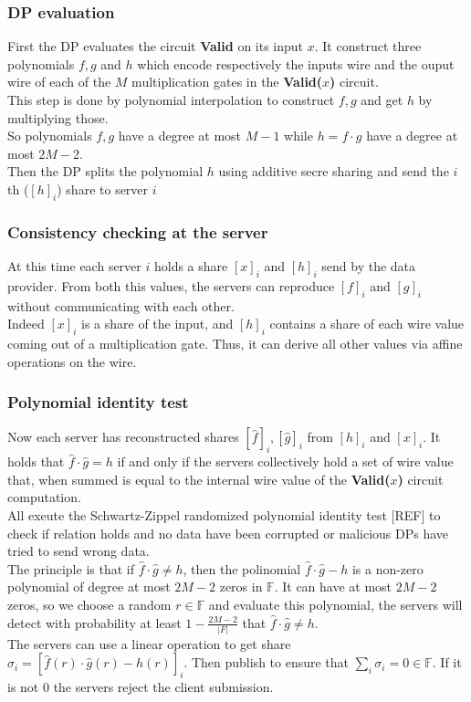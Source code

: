 \documentclass{article}
\begin{document}
\subsubsection{DP evaluation}
First the DP evaluates the circuit \textbf{Valid} on its input $x$. It construct three polynomials $f,g $ and $h$ which encode respectively the inputs wire and the ouput wire of each of the $M$ multiplication gates in the \textbf{Valid($x$)} circuit.\\
This step is done by polynomial interpolation to construct $f,g$ and get $h$ by multiplying those.\\
So polynomials $f,g$ have a degree at most $M-1$ while $h = f \cdot g$ have a degree at most $2M-2$.\\
Then the DP splits the polynomial $h$ using additive secre sharing and send the $i$th ($[h]_i$) share to server $i$
\subsubsection{Consistency checking at the server}
At this time each server $i$ holds a share $[x]_i$ and $[h]_i$ send by the data provider. From both this values, the servers can reproduce $[f]_i$ and $[g]_i$ without communicating with each other.\\
Indeed $[x]_i$ is a share of the input, and $[h]_i$ contains a share of each wire value coming out of a multiplication gate. Thus, it can derive all other values via affine operations on the wire.
\subsubsection{Polynomial identity test}
Now each server has reconstructed shares $[\hat{f}]_i, [\hat{g}]_i$ from $[h]_i$ and $[x]_i$. It holds that $ \hat{f} \cdot \hat{g} = h$ if and only if the servers collectively hold a set of wire value that, when summed is equal to the internal wire value of the \textbf{Valid($x$)} circuit computation.\\
All exeute the Schwartz-Zippel randomized polynomial identity test [REF] to check if relation holds and no data have been corrupted or malicious DPs have tried to send wrong data.\\
The principle is that if $ \hat{f} \cdot \hat{g} \neq h$, then the polinomial $ \hat{f} \cdot \hat{g} - h$ is a non-zero polynomial of degree at most $2M-2$ zeros in $\mathbb{F}$. It can have at most $2M-2$ zeros, so we choose a random $r \in \mathbb{F}$ and evaluate this polynomial, the servers will detect with probability at least $1 - \frac{2M-2}{|F|}$ that $ \hat{f} \cdot \hat{g} \neq h$.\\
The servers can use a linear operation to get share $\sigma_i = [ \hat{f}(r) \cdot \hat{g}(r) - h(r)]_i$. Then publish to ensure that $\sum_{i}{\sigma_i} = 0 \in \mathbb{F}$. If it is not $0$ the servers reject the client submission.
\end{document}
